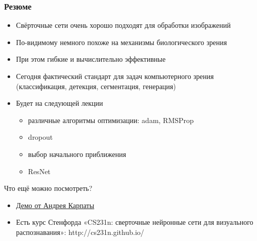 \documentclass[fullscreen=true, bookmarks=true, hyperref={pdfencoding=unicode}]{beamer}
\begin{document}
\begin{frame}
  \frametitle{Резюме}
  \begin{itemize}
    \item Свёрточные сети очень хорошо подходят для обработки изображений
    \item По-видимому немного похоже на механизмы биологического зрения
    \item При этом гибкие и вычислительно эффективные
    \item Сегодня фактический стандарт для задач компьютерного зрения (классификация, детекция, сегментация, генерация)
    \item Будет на следующей лекции
      \begin{itemize}
        \item различные алгоритмы оптимизации: adam, RMSProp
        \item dropout
        \item выбор начального приближения
        \item ResNet
      \end{itemize}
  \end{itemize}

  Что ещё можно посмотреть?
  \begin{itemize}
    \item \href{https://cs.stanford.edu/people/karpathy/convnetjs/}{Демо от Андрея Карпаты}
    \item Есть курс Стенфорда «CS231n: сверточные нейронные сети для визуального распознавания»: http://cs231n.github.io/
  \end{itemize}
\end{frame}
\end{document}
